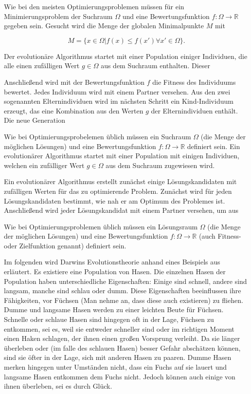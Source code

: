 Wie bei den meisten Optimierungsproblemen müssen für ein Minimierungsproblem der Suchraum $\Omega$ und eine Bewertungsfunktion $f: \Omega \to \mathbb{R}$ gegeben sein. Gesucht wird die Menge der globalen Minimalpunkte $M$ mit

\begin{equation}
M = \{x \in \Omega | f(x) \leq f(x') \forall x' \in \Omega \}.
\end{equation}

Der evolutionäre Algorithmus startet mit einer Population einiger Individuen, die alle einen zufälligen Wert $g \in \Omega$ aus dem Suchraum enthalten. Dieser 

Anschließend wird mit der Bewertungsfunktion $f$ die Fitness des Individuums bewertet. Jedes Individuum wird mit einem Partner versehen. Aus den zwei sogenannten Elternindividuen wird im nächsten Schritt ein Kind-Individuum erzeugt, das eine Kombination aus den Werten $g$ der Elternindividuen enthält. Die neue Generation

Wie bei Optimierungsprobelemen üblich müssen ein Suchraum $\Omega$ (die Menge der möglichen Lösungen) und eine Bewertungsfunktion $f: \Omega \to \mathbb{R}$ definiert sein. Ein evolutionärer Algorithmus startet mit einer Population mit einigen Individuen, welchen ein zufälliger Wert $g \in \Omega$ aus dem Suchraum zugewiesen wird. 

Ein evolutionärer Algorithmus erstellt zunächst einige Lösungskandidaten mit zufälligen Werten für das zu optimierende Problem. Zunächst wird für jeden Lösungskandidaten bestimmt, wie nah er am Optimum des Problemes ist. Anschließend wird jeder Lösungskandidat mit einem Partner versehen, um aus 

Wie bei Optimierungsproblemen üblich müssen ein Lösungsraum $\Omega$ (die Menge der möglichen Lösungen) und eine Bewertungsfunktion $f: \Omega \to \mathbb{R}$ (auch Fitness- oder Zielfunktion genannt) definiert sein. 



Im folgenden wird Darwins Evolutionstheorie anhand eines Beispiels aus \cite{Rabbits:1} erläutert. Es existiere eine Population von Hasen. Die einzelnen Hasen der Population haben unterschiedliche Eigenschaften: Einige sind schnell, andere sind langsam, manche sind schlau oder dumm. Diese Eigenschaften beeinflussen ihre Fähigkeiten, vor Füchsen (Man nehme an, dass diese auch existieren) zu fliehen. Dumme und langsame Hasen werden zu einer leichten Beute für Füchsen. Schnelle oder schlaue Hasen sind hingegen oft in der Lage, Füchsen zu entkommen, sei es, weil sie entweder schneller sind oder im richtigen Moment einen Haken schlagen, der ihnen einen großen Vorsprung verleiht. Da sie länger überleben oder (im falle des schlauen Hasen) besser Gefahr abschätzen können, sind sie öfter in der Lage, sich mit anderen Hasen zu paaren. Dumme Hasen merken hingegen unter Umständen nicht, dass ein Fuchs auf sie lauert und langsame Hasen entkommen dem Fuchs nicht. Jedoch können auch einige von ihnen überleben, sei es durch Glück. 

